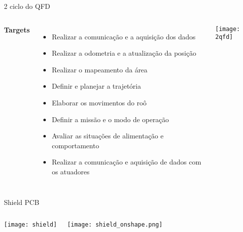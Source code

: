 \begin{frame}[t]{2 ciclo do QFD} 
    \begin{columns}
        \footnotesize
            \footnotesize
                \textbf{Targets} 
                \begin{itemize}
                    \footnotesize
                    \item Realizar a comunicação e a aquisição dos dados
                    \item Realizar a odometria e a atualização da posição
                    \item Realizar o mapeamento da área
                    \item Definir e planejar a trajetória
                    \item Elaborar os movimentos do roô
                    \item Definir a missão e o modo de operação
                    \item Avaliar as situações de alimentação e comportamento
                    \item Realizar a comunicação e aquisição de dados com os atuadores
                \end{itemize}
            \newline
            \vspace{-0.55cm}
            \texttt{[image: 2qfd]}
    \end{columns}
    
\end{frame}
\begin{frame}[t]{Shield PCB} 
    \begin{columns}
        \texttt{[image: shield]}

        \texttt{[image: shield\_onshape.png]}
        \vspace{-1cm}

    \end{columns}
\end{frame}


